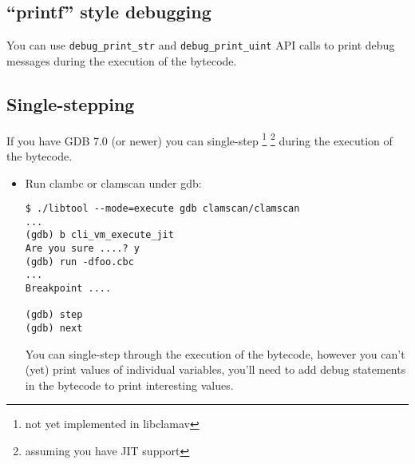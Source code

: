 \subsection{``printf'' style debugging}
You can use \verb+debug_print_str+ and \verb+debug_print_uint+ API %
calls to print debug messages during the execution of the bytecode.

\subsection{Single-stepping}
If you have GDB 7.0 (or newer) you can single-step \footnote{not yet implemented in libclamav} \footnote{assuming you have JIT support}
during the execution of the bytecode.
\begin{itemize}
 \item Run clambc or clamscan under gdb:
\begin{verbatim}
$ ./libtool --mode=execute gdb clamscan/clamscan
...
(gdb) b cli_vm_execute_jit
Are you sure ....? y
(gdb) run -dfoo.cbc
...
Breakpoint ....

(gdb) step
(gdb) next
\end{verbatim}

You can single-step through the execution of the bytecode, however you can't (yet) print values of individual variables,
you'll need to add debug statements in the bytecode to print interesting values.

\end{itemize}


